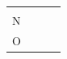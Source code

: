 \begin{enumerate}[noitemsep, label=\textbf{\arabic*}. ]
{\begin{tabular}[t]{|l|l|l|l|}
         &
    
    
     \tabularnewline\cline{1-1}\cline{2-2}\cline{3-3}\cline{4-4}
    
    
        \begin{math}\mathrm{N}\end{math} &
    
    
         &
    
    
         &
    
    
     \tabularnewline\cline{1-1}\cline{2-2}\cline{3-3}\cline{4-4}
    
    
        \begin{math}\mathrm{O}\end{math} &
    
    
         &
    

\end{tabular}}
\end{enumerate}
